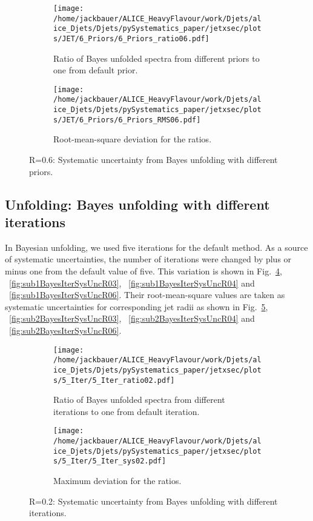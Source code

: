 \begin{figure}
\centering
\begin{subfigure}{.5\textwidth}
  \centering
  \texttt{[image: /home/jackbauer/ALICE\_HeavyFlavour/work/Djets/alice\_Djets/Djets/pySystematics\_paper/jetxsec/plots/JET/6\_Priors/6\_Priors\_ratio06.pdf]}
  \caption{Ratio of Bayes unfolded spectra from different priors to one from default prior.}
  \label{fig:sub1BayesPriorSysUncR06}
\end{subfigure}%
\begin{subfigure}{.5\textwidth}
  \centering
  \texttt{[image: /home/jackbauer/ALICE\_HeavyFlavour/work/Djets/alice\_Djets/Djets/pySystematics\_paper/jetxsec/plots/JET/6\_Priors/6\_Priors\_RMS06.pdf]}
  \caption{Root-mean-square deviation for the ratios.}
  \label{fig:sub2BayesPriorSysUncR06}
\end{subfigure}
\caption{R=0.6: Systematic uncertainty from Bayes unfolding with different priors.}
  \label{fig:BayesPriorSysUncR06}
\end{figure}

\subsection{Unfolding: Bayes unfolding with different iterations}
\label{sUnfoldSysBayesIter}
In Bayesian unfolding, we used five iterations for the default method. As a source of systematic uncertainties, the number of iterations were changed by plus or minus one from the default value of five. This variation is shown in Fig.~\ref{fig:sub1BayesIterSysUncR02}, ~\ref{fig:sub1BayesIterSysUncR03}, ~\ref{fig:sub1BayesIterSysUncR04} and ~\ref{fig:sub1BayesIterSysUncR06}. Their root-mean-square values are taken as systematic uncertainties for corresponding jet radii as shown in Fig.~\ref{fig:sub2BayesIterSysUncR02}, ~\ref{fig:sub2BayesIterSysUncR03}, ~\ref{fig:sub2BayesIterSysUncR04} and ~\ref{fig:sub2BayesIterSysUncR06}.

\begin{figure}
\centering
\begin{subfigure}{.5\textwidth}
  \centering
  \texttt{[image: /home/jackbauer/ALICE\_HeavyFlavour/work/Djets/alice\_Djets/Djets/pySystematics\_paper/jetxsec/plots/5\_Iter/5\_Iter\_ratio02.pdf]}
  \caption{Ratio of Bayes unfolded spectra from different iterations to one from default iteration.}
  \label{fig:sub1BayesIterSysUncR02}
\end{subfigure}%
\begin{subfigure}{.5\textwidth}
  \centering
  \texttt{[image: /home/jackbauer/ALICE\_HeavyFlavour/work/Djets/alice\_Djets/Djets/pySystematics\_paper/jetxsec/plots/5\_Iter/5\_Iter\_sys02.pdf]}
  \caption{Maximum deviation for the ratios.}
  \label{fig:sub2BayesIterSysUncR02}
\end{subfigure}
\caption{R=0.2: Systematic uncertainty from Bayes unfolding with different iterations.}
  \label{fig:BayesIterSysUncR02}
\end{figure}

